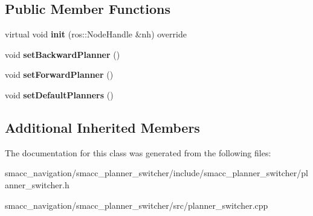 \subsection*{Public Member Functions}
\begin{DoxyCompactItemize}
\item 
virtual void {\bfseries init} (ros\+::\+Node\+Handle \&nh) override\hypertarget{classsmacc__planner__switcher_1_1PlannerSwitcher_a156075677c6774e8933135ad8cc38f60}{}\label{classsmacc__planner__switcher_1_1PlannerSwitcher_a156075677c6774e8933135ad8cc38f60}

\item 
void {\bfseries set\+Backward\+Planner} ()\hypertarget{classsmacc__planner__switcher_1_1PlannerSwitcher_a848558a4309a42c546ab87e65722da2f}{}\label{classsmacc__planner__switcher_1_1PlannerSwitcher_a848558a4309a42c546ab87e65722da2f}

\item 
void {\bfseries set\+Forward\+Planner} ()\hypertarget{classsmacc__planner__switcher_1_1PlannerSwitcher_a6510ee1f23243ee725c61e590354d3bc}{}\label{classsmacc__planner__switcher_1_1PlannerSwitcher_a6510ee1f23243ee725c61e590354d3bc}

\item 
void {\bfseries set\+Default\+Planners} ()\hypertarget{classsmacc__planner__switcher_1_1PlannerSwitcher_a9672bbbb245b3a5120b365810c9cc746}{}\label{classsmacc__planner__switcher_1_1PlannerSwitcher_a9672bbbb245b3a5120b365810c9cc746}

\end{DoxyCompactItemize}
\subsection*{Additional Inherited Members}


The documentation for this class was generated from the following files\+:\begin{DoxyCompactItemize}
\item 
smacc\+\_\+navigation/smacc\+\_\+planner\+\_\+switcher/include/smacc\+\_\+planner\+\_\+switcher/planner\+\_\+switcher.\+h\item 
smacc\+\_\+navigation/smacc\+\_\+planner\+\_\+switcher/src/planner\+\_\+switcher.\+cpp\end{DoxyCompactItemize}
